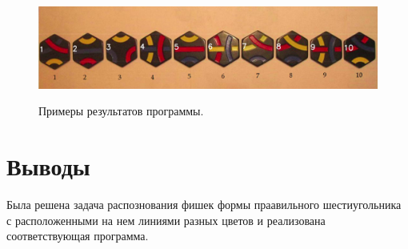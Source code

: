 \documentclass[10pt]{article}
\begin{document}
\begin{figure}[h]
		\begin{minipage}[h]{\linewidth}
			\begin{center}
				{\includegraphics[width=1.0\linewidth]{data/result-5.pdf}}
			\end{center}
		\end{minipage}
	
		
		\caption{Примеры результатов программы.}
		\label{ris:image5}
	\end{figure}
	
	
	
	\section*{Выводы}
	
	Была решена задача распознования фишек формы праавильного шестиугольника с расположенными на нем линиями разных цветов и реализована соответствующая программа.
	
	
\end{document}
